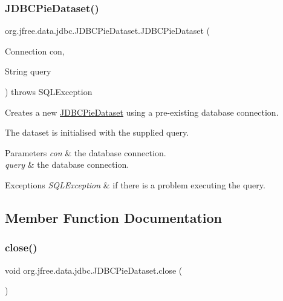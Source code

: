 \subsubsection{\texorpdfstring{J\+D\+B\+C\+Pie\+Dataset()}{JDBCPieDataset()}\hspace{0.1cm}{\footnotesize\ttfamily [3/3]}}
{\footnotesize\ttfamily org.\+jfree.\+data.\+jdbc.\+J\+D\+B\+C\+Pie\+Dataset.\+J\+D\+B\+C\+Pie\+Dataset (\begin{DoxyParamCaption}\item[{Connection}]{con,  }\item[{String}]{query }\end{DoxyParamCaption}) throws S\+Q\+L\+Exception}

Creates a new \mbox{\hyperlink{classorg_1_1jfree_1_1data_1_1jdbc_1_1_j_d_b_c_pie_dataset}{J\+D\+B\+C\+Pie\+Dataset}} using a pre-\/existing database connection. 

The dataset is initialised with the supplied query.


\begin{DoxyParams}{Parameters}
{\em con} & the database connection. \\
\hline
{\em query} & the database connection.\\
\hline
\end{DoxyParams}

\begin{DoxyExceptions}{Exceptions}
{\em S\+Q\+L\+Exception} & if there is a problem executing the query. \\
\hline
\end{DoxyExceptions}


\subsection{Member Function Documentation}
\mbox{\label{classorg_1_1jfree_1_1data_1_1jdbc_1_1_j_d_b_c_pie_dataset_a40ab494ddaf4524fbcafafc0539fdcb5}} 
\subsubsection{\texorpdfstring{close()}{close()}}
{\footnotesize\ttfamily void org.\+jfree.\+data.\+jdbc.\+J\+D\+B\+C\+Pie\+Dataset.\+close (\begin{DoxyParamCaption}{ }\end{DoxyParamCaption})}

